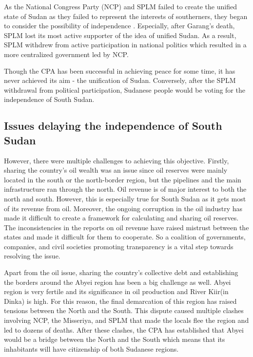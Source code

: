 \documentclass[14pt,a4paper]{article}
\begin{document}
As the National Congress Party (NCP) and SPLM failed to create the unified state of Sudan as they failed to represent the interests of southerners, they began to consider the possibility of independence \cite{NewSudan}. Especially, after Garang's death, SPLM lost its most active supporter of the idea of unified Sudan. As a result, SPLM withdrew from active participation in national politics which resulted in a more centralized government led by NCP. 

Though the CPA has been successful in achieving peace for some time, it has never achieved its aim - the unification of Sudan. Conversely, after the SPLM withdrawal from political participation, Sudanese people would be voting for the independence of South Sudan. 



\subsection{Issues delaying the independence of South Sudan}
However, there were multiple challenges to achieving this objective. Firstly, sharing the country's oil wealth was an issue since oil reserves were mainly located in the south or the north-border region, but the pipelines and the main infrastructure ran through the north. Oil revenue is of major interest to both the north and south. However, this is especially true for South Sudan as it gets most of its revenue from oil. Moreover, the ongoing corruption in the oil industry has made it difficult to create a framework for calculating and sharing oil reserves. The inconsistencies in the reports on oil revenue have raised mistrust between the states and made it difficult for them to cooperate. So a coalition of governments, companies, and civil societies promoting transparency is a vital step towards resolving the issue. 

Apart from the oil issue, sharing the country's collective debt and establishing the borders around the Abyei region has been a big challenge as well. Abyei region is very fertile and its significance in oil production and River Kiir(in Dinka) is high. For this reason, the final demarcation of this region has raised tensions between the North and the South. This dispute caused multiple clashes involving NCP, the Misseriya, and SPLM that made the locals flee the region and led to dozens of deaths. After these clashes, the CPA has established that Abyei would be a bridge between the North and the South which means that its inhabitants will have citizenship of both Sudanese regions. 
\end{document}
